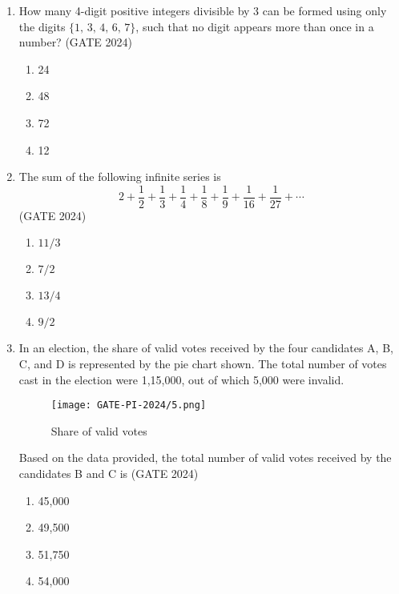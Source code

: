\documentclass[journal,12pt,onecolumn]{IEEEtran}
\theoremstyle{remark}
\begin{document}
\begin{enumerate}
\item How many 4-digit positive integers divisible by 3 can be formed using only the digits $\{1,\,3,\,4,\,6,\,7\}$, such that no digit appears more than once in a number?
\hfill{(GATE 2024)}
\begin{multicols}{4}
\begin{enumerate}
    \item 24
    \item 48
    \item 72
    \item 12
\end{enumerate}
\end{multicols}
\vspace{1cm}
\newpage
\item The sum of the following infinite series is
\[
2 + \frac{1}{2} + \frac{1}{3} + \frac{1}{4} + \frac{1}{8} + \frac{1}{9} + \frac{1}{16} + \frac{1}{27} + \cdots
\]
\hfill{(GATE 2024)}
\begin{multicols}{4}
\begin{enumerate}
    \item $11/3$
    \item $7/2$
    \item $13/4$
    \item $9/2$
\end{enumerate}
\end{multicols}
\vspace{1cm}

\item In an election, the share of valid votes received by the four candidates A, B, C, and D is represented by the pie chart shown. The total number of votes cast in the election were 1,15,000, out of which 5,000 were invalid.

\begin{figure}[H]
    \centering
    \texttt{[image: GATE-PI-2024/5.png]} 
    \caption{Share of valid votes}
    \label{5}
\end{figure}

Based on the data provided, the total number of valid votes received by the candidates B and C is
\hfill{(GATE 2024)}
\begin{multicols}{4}
\begin{enumerate}
    \item 45,000
    \item 49,500
    \item 51,750
    \item 54,000
\end{enumerate}
\end{multicols}
\vspace{1cm}


\end{enumerate}
\end{document}
